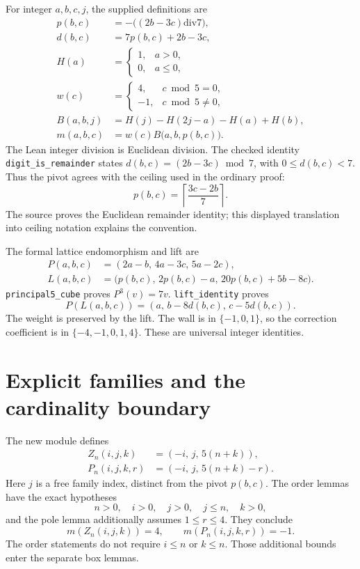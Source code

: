 \documentclass[11pt]{article}
\newcommand{\decl}[1]{\nolinkurl{#1}}
\begin{document}
For integer \(a,b,c,j\), the supplied definitions are
\begin{align*}
 p(b,c)&=-\bigl((2b-3c)\mathbin{\mathrm{div}}7\bigr),\\[6pt]
 d(b,c)&=7p(b,c)+2b-3c,\\[6pt]
 H(a)&=\begin{cases}1,&a>0,\\0,&a\le0,\end{cases}\\[6pt]
 w(c)&=\begin{cases}4,&c\bmod5=0,\\-1,&c\bmod5\ne0,\end{cases}\\[6pt]
 B(a,b,j)&=H(j)-H(2j-a)-H(a)+H(b),\\[6pt]
 m(a,b,c)&=w(c)B\bigl(a,b,p(b,c)\bigr).
\end{align*}
The Lean integer division is Euclidean division. The checked identity
\decl{digit_is_remainder} states \(d(b,c)=(2b-3c)\bmod7\), with
\(0\le d(b,c)<7\). Thus the pivot agrees with the ceiling used in the ordinary proof:
\[
 p(b,c)=\left\lceil\frac{3c-2b}{7}\right\rceil.
\]
The source proves the Euclidean remainder identity; this displayed translation into ceiling notation explains the convention.

The formal lattice endomorphism and lift are
\begin{align*}
 P(a,b,c)&=(2a-b,\,4a-3c,\,5a-2c),\\[6pt]
 L(a,b,c)&=\bigl(p(b,c),\,2p(b,c)-a,\,20p(b,c)+5b-8c\bigr).
\end{align*}
\decl{principal5_cube} proves \(P^3(v)=7v\).
\decl{lift_identity} proves
\[
 P(L(a,b,c))=(a,\,b-8d(b,c),\,c-5d(b,c)).
\]
The weight is preserved by the lift. The wall is in \(\{-1,0,1\}\), so the correction coefficient is in \(\{-4,-1,0,1,4\}\). These are universal integer identities.

\section{Explicit families and the cardinality boundary}

The new module defines
\begin{align*}
 Z_n(i,j,k)&=(-i,\,j,\,5(n+k)),\\[7pt]
 P_n(i,j,k,r)&=(-i,\,j,\,5(n+k)-r).
\end{align*}
Here \(j\) is a free family index, distinct from the pivot \(p(b,c)\). The order lemmas have the exact hypotheses
\[
 n>0,\quad i>0,\quad j>0,\quad j\le n,\quad k>0,
\]
and the pole lemma additionally assumes \(1\le r\le4\). They conclude
\[
 m(Z_n(i,j,k))=4,\qquad m(P_n(i,j,k,r))=-1.
\]
The order statements do not require \(i\le n\) or \(k\le n\). Those additional bounds enter the separate box lemmas.
\end{document}
